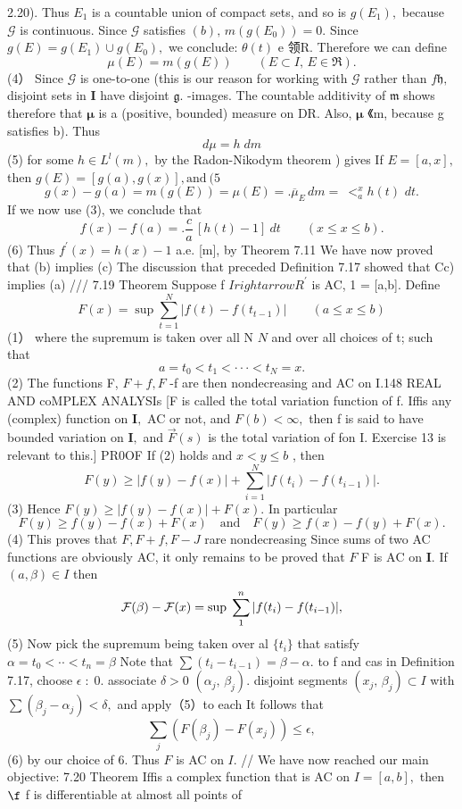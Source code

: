 2.20). Thus $E_{1}$ is a countable union of compact sets, and so is $g(E_{1}),$ because $\scriptstyle{\mathcal{G}}$ is continuous. Since $\scriptstyle{\mathcal{G}}$ satisfies $(b),\,m(g(E_{0}))=0.$ Since $g(E)=g(E_{1})\cup g(E_{0}),$ we conclude: $\scriptstyle{\theta(t)}$ e 领R. Therefore we can define $$ \mu(E)=m(g(E))\qquad(E\subset I,\,E\in\Re). $$ (4） Since $\scriptstyle{\mathcal{G}}$ is one-to-one (this is our reason for working with $\scriptstyle{\mathcal{G}}$ rather than $f{\mathfrak{h}},$ disjoint sets in ${\mathbf I}$ have disjoint ${\mathfrak{g}}.$ -images. The countable additivity of ${\mathfrak{m}}$ shows therefore that ${\boldsymbol{\mu}}$ is a (positive, bounded) measure on DR. Also, ${\boldsymbol{\mu}}$ 《m, because g satisfies b). Thus $$ d\mu=h\;d m $$ (5) for some $h\in L^{l}(m),$ by the Radon-Nikodym theorem ) gives If $E=[a,x],$ then $g(E)=[g(a),g(x)],\mathrm{and}\ (5$ $$ g(x)-g(a)=m(g(E))=\mu(E)= .{\overline{{\mu}}}_{E}^{}\,d m=\ <_{a}^{x}h(t)\,\,d t. $$ If we now use (3), we conclude that $$ f(x)-f(a)= .{\frac{c}{a}}\,[h(t)-1]\ d{t}\quad\quad(x\leq x\leq b). $$ (6) Thus $f^{\prime}(x)=h(x)-1$ a.e. [m], by Theorem 7.11 We have now proved that (b) implies (c) The discussion that preceded Definition 7.17 showed that Cc) implies (a) /// 7.19 Theorem Suppose f $\scriptstyle I rightarrow R^{\prime}$ is AC, 1 = [a,b]. Define $$ F(x)=\operatorname*{sup}\sum_{t=1}^{N}|f(t)-f(t_{t-1})|\qquad(a\leq x\leq b) $$ (1） where the supremum is taken over all N ${\mathbf{}}N$ and over all choices of {t;} such that $$ a=t_{0}<t_{1}<\cdot\cdot\cdot<t_{N}=x. $$ (2) The functions F, $F+f,F$ -f are then nondecreasing and AC on I.148 REAL AND coMPLEX ANALYSIs [F is called the total variation function of f. Iffis any (complex) function on ${\boldsymbol{I}},$ AC or not, and $F(b)<\infty,$ then f is said to have bounded variation on ${\boldsymbol{I}},$ and $\scriptstyle{\vec{F}}(s)$ is the total variation of fon I. Exercise 13 is relevant to this.] PR0OF If (2) holds and $x<y\leq b$ , then $$ F(y)\geq|f(y)-f(x)|+\sum_{i=1}^{N}|f(t_{i})-f(t_{i-1})|. $$ (3) Hence $F(y)\geq{\bigl|}f(y)-f(x){\bigl|}+F(x).$ In particular $$ F(y)\geq f(y)-f(x)+F(x)\quad{\mathrm{and}}\quad F(y)\geq f(x)-f(y)+F(x). $$ (4) This proves that $F,F+f,F-J$ rare nondecreasing Since sums of two AC functions are obviously AC, it only remains to be proved that ${\mathbf{}}F$ F is $\mathrm{AC}$ on ${\boldsymbol{I}}.$ If $(a,\beta)\in I$ then $$ {\cal F}(\beta)-{\cal F}(x)=\mathrm{sup}\;\sum_{1}^{n}|f(t_{i})-f(t_{i-1})|, $$ (5) Now pick the supremum being taken over al $\{t_{i}\}$ that satisfy $\alpha=t_{0}<\cdot\cdot<t_{n}=\beta$ Note that $\sum\left(t_{i}-t_{i-1}\right)=\beta-\alpha.$ to f and cas in Definition 7.17, choose $\scriptstyle\epsilon\;:\;0.$ associate $\delta>0$ $(\alpha_{j},\,\beta_{j}).$ disjoint segments $(x_{j},\,\beta_{j})\subset I$ with $\sum\left(\beta_{j}-\alpha_{j}\right)<\delta,$ and apply（5）to each It follows that $$ \sum_{j}\left(F(\beta_{j})-F(x_{j})\right)\leq\epsilon, $$ (6) by our choice of 6. Thus ${\mathbf{}}F$ is AC on ${\boldsymbol{\mathit{I}}}.$ // We have now reached our main objective: 7.20 Theorem Iffis a complex function that is AC on $I=[a,b],$ then $\boldsymbol{\f}$ f is differentiable at almost all points of 